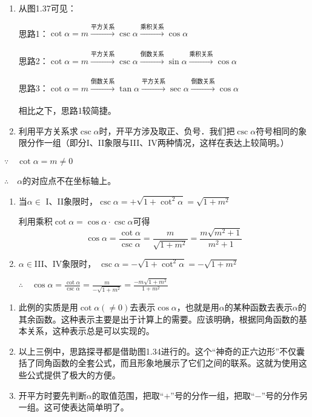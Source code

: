 \begin{analyze}
\begin{enumerate}[(1)]
    \item 从图1.37可见：

思路1：$\cot\alpha=m \xrightarrow[]{\text{平方关系}}\csc\alpha\xrightarrow[]{\text{乘积关系}}\cos\alpha$

思路2：$\cot\alpha=m \xrightarrow[]{\text{平方关系}}\csc\alpha\xrightarrow[]{\text{倒数关系}}\sin\alpha\xrightarrow[]{\text{乘积关系}}\cos\alpha$

思路3：$\cot\alpha=m \xrightarrow[]{\text{倒数关系}}\tan\alpha\xrightarrow[]{\text{平方关系}}\sec\alpha\xrightarrow[]{\text{倒数关系}}\cos\alpha$

相比之下，思路1较简捷。

\item 利用平方关系求$\csc\alpha$时，开平方涉及取正、负号．我们把$\csc\alpha$符号相同的象限分作一组（即分I、II象限与III、IV两种情况，这样在表达上较简明。）
\end{enumerate}
\end{analyze}


\begin{solution}
$\because\quad \cot\alpha=m\ne 0$

$\therefore\quad \alpha$的对应点不在坐标轴上。

\begin{enumerate}[(1)]
    \item 当$\alpha\in$ I、II象限时，$\csc\alpha=+\sqrt{1+\cot^2\alpha}=\sqrt{1+m^2}$
    
利用乘积$\cot\alpha=\cos\alpha\cdot \csc\alpha$可得
\[\cos\alpha=\frac{\cot\alpha}{\csc\alpha}=\frac{m}{\sqrt{1+m^2}}=\frac{m\sqrt{m^2+1}}{m^2+1}\]
\item $\alpha\in $III、IV象限时，
$\csc\alpha=-\sqrt{1+\cot^2\alpha}=-\sqrt{1+m^2}$

$\therefore\quad \cos\alpha=\frac{\cot\alpha}{\csc\alpha}=\frac{m}{-\sqrt{1+m^2}}=\frac{-m\sqrt{1+m^2}}{1+m^2}$
\end{enumerate}
\end{solution}
    
\begin{remark}
\begin{enumerate}
    \item 此例的实质是用$\cot\alpha(\ne  0)$去表示$\cos\alpha$，也就是用$\alpha$的某种函数去表示$\alpha$的其余函数。这种表示主要是出于计算上的需要。应该明确，根据同角函数的基本关系，这种表示总是可以实现的。
    \item 以上三例中，思路探寻都是借助图1.34进行的。这个“神奇的正六边形”不仅囊括了同角函数的全套公式，而且形象地展示了它们之间的联系。这就为使用这些公式提供了极大的方便。
    \item 开平方时要先判断$\alpha$的取值范围，把取“$+$”号的分作一组，把取“$-$”号的分作另一组。这可使表达简单明了。
\end{enumerate}
\end{remark}


